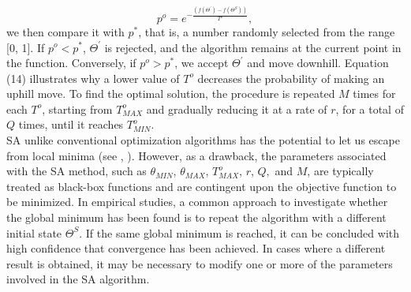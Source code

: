 \documentclass[<1p>]{elsarticle} %
\begin{document}
\begin{equation}
    p^o = e^{-\frac{(f(\Theta^{\prime}) - f(\Theta^S))}{T^{o}}},
\end{equation}
we then compare it with $p^{*}$, that is, a number randomly selected from the range [0, 1]. If $p^o < p^{*}$, $\Theta^{\prime}$ is rejected, and the algorithm remains at the current point in the function. Conversely, if $p^o > p^{*}$, we accept $\Theta^{\prime}$ and move downhill. Equation (14) illustrates why a lower value of $T^o$ decreases the probability of making an uphill move. To find the optimal solution, the procedure is repeated $M$ times for each $T^{o}$, starting from $T^{o}_{MAX}$ and gradually reducing it at a rate of $r$, for a total of $Q$ times, until it reaches $T^{o}_{MIN}$.\\
\indent SA unlike conventional optimization algorithms has the potential to let us escape from local minima (see \cite{corana1987minimizing}, \cite{aarts2005simulated}). However, as a drawback, the parameters associated with the SA method, such as $\theta_{MIN}$, $\theta_{MAX}$, $T^{o}_{MAX}$, $r$, $Q,$ and $M$, are typically treated as black-box functions and are contingent upon the objective function to be minimized. In empirical studies, a common approach to investigate whether the global minimum has been found is to repeat the algorithm with a different initial state $\Theta^{S}$. If the same global minimum is reached, it can be concluded with high confidence that convergence has been achieved. In cases where a different result is obtained, it may be necessary to modify one or more of the parameters involved in the SA algorithm.\\
\end{document}
